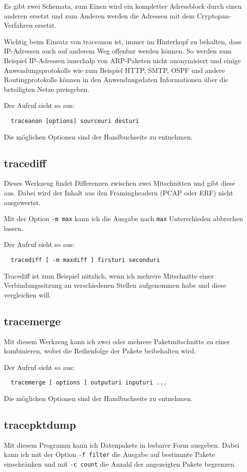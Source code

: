 \begin{normaltext}
  Es gibt zwei Schemata, zum Einen wird ein kompletter Adressblock durch einen
  anderen ersetzt und zum Anderen werden die Adressen mit dem
  Cryptopan-Verfahren ersetzt.

  Wichtig beim Einsatz von traceanon ist, immer im Hinterkopf zu behalten,
  dass IP-Adressen auch auf anderem Weg offenbar werden können. So werden zum
  Beispiel IP-Adressen innerhalp von ARP-Paketen nicht anonymisiert und einige
  Anwendungsprotokolle wie zum Beispiel HTTP, SMTP, OSPF und andere
  Routingprotokolle können in den Anwendungsdaten Informationen über die
  beteiligten Netze preisgeben.

  Der Aufruf sieht so aus:
  \begin{verbatim}
  traceanon [options] sourceuri desturi
  \end{verbatim}
  Die möglichen Optionen sind der Handbuchseite zu entnehmen.

  \subsection*{tracediff}
  Dieses Werkzeug findet Differenzen zwischen zwei Mitschnitten und gibt diese
  aus. Dabei wird der Inhalt aus den Framingheadern (PCAP oder ERF) nicht
  ausgewertet.

  Mit der Option \verb?-m max? kann ich die Ausgabe nach \verb?max?
  Unterschieden abbrechen lassen.

  Der Aufruf sieht so aus:
  \begin{verbatim}
  tracediff [ -m maxdiff ] firsturi seconduri
  \end{verbatim}

  Tracediff ist zum Beispiel nützlich, wenn ich mehrere Mitschnitte einer
  Verbindungssitzung an verschiedenen Stellen aufgenommen habe und diese
  vergleichen will.

  \subsection*{tracemerge}
  Mit diesem Werkzeug kann ich zwei oder mehrere Paketmitschnitte zu einer
  kombinieren, wobei die Reihenfolge der Pakete beibehalten wird.

  Der Aufruf sieht so aus:
  \begin{verbatim}
  tracemerge [ options ] outputuri inputuri ...
  \end{verbatim}
  Die möglichen Optionen sind der Handbuchseite zu entnehmen.

  \subsection*{tracepktdump}
  Mit diesem Programm kann ich Datenpakete in lesbarer Form ausgeben.
  Dabei kann ich mit der Option \verb?-f filter? die Ausgabe auf bestimmte
  Pakete einschränken und mit \verb?-c count? die Anzahl der angezeigten
  Pakete begrenzen.


\end{normaltext}
